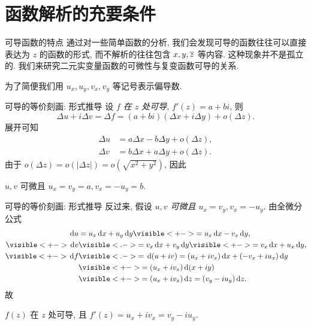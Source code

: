 \section{函数解析的充要条件}


\begin{frame}{可导函数的特点}
\onslide<+->
通过对一些简单函数的分析, 我们会发现可导的函数往往可以直接表达为 $z$ 的函数的形式, 而不解析的往往包含 $x,y,\overline z$ 等内容.
\onslide<+->
这种现象并不是孤立的.
\onslide<+->
我们来研究二元实变量函数的可微性与复变函数可导的关系.

\onslide<+->
为了简便我们用 $u_x,u_y,v_x,v_y$ 等记号表示偏导数.
\end{frame}


\begin{frame}{可导的等价刻画: 形式推导}
\onslide<+->
设 \emph{$f$ 在 $z$ 处可导}, $f'(z)=a+bi$,
\onslide<+->
则
\[\Delta u+i\Delta v=\Delta f=(a+bi)(\Delta x+i\Delta y)+o(\Delta z).\]
\onslide<+->展开可知
\begin{align*}
\Delta u&=a\Delta x-b\Delta y+o(\Delta z),\\
\Delta v&=b\Delta x+a\Delta y+o(\Delta z).
\end{align*}
\onslide<+->
由于 $o(\Delta z)=o(|\Delta z|)=o(\sqrt{x^2+y^2})$,
\onslide<+->因此 
\begin{block@}
\begin{center}
$u,v$ 可微且 $u_x=v_y=a,v_x=-u_y=b$.
\end{center}
\end{block@}
\end{frame}


\begin{frame}{可导的等价刻画: 形式推导}
\onslide<+->反过来, 假设 \emph{$u,v$ 可微且 $u_x=v_y, v_x=-u_y$}.
\onslide<+->由全微分公式
\begin{align*}
\diff u&=u_x\diff x+u_y\diff y
\visible<+->{=u_x\diff x-v_x\diff y,}\\
\visible<+->{\diff v}&\visible<.->{=v_x\diff x+v_y\diff y}\visible<+->{=v_x\diff x+u_x\diff y,}\\
\visible<+->{\diff f}&
\visible<.->{=\diff (u+iv)=(u_x+i v_x)\diff x+(-v_x+i u_x)\diff y}\\
&\visible<+->{=(u_x+i v_x)\diff(x+iy)}\\
&\visible<+->{=(u_x+i v_x)\diff z=(v_y-i u_y)\diff z.}
\end{align*}
\onslide<+->故
\begin{block@}
\begin{center}
$f(z)$ 在 $z$ 处可导, 且 $f'(z)=u_x+i v_x=v_y-i u_y$.
\end{center}
\end{block@}
\end{frame}


